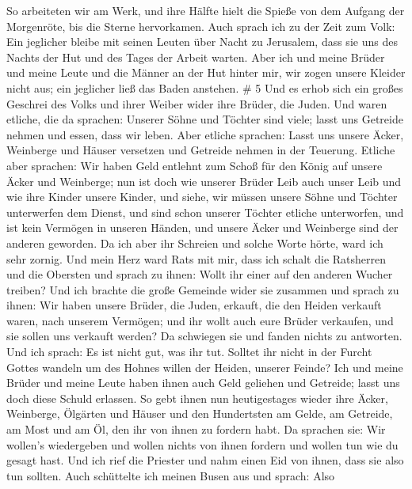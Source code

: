  So arbeiteten wir am Werk, und ihre Hälfte hielt die
Spieße von dem Aufgang der Morgenröte, bis die Sterne hervorkamen.
 Auch sprach ich zu der Zeit zum Volk: Ein jeglicher
bleibe mit seinen Leuten über Nacht zu Jerusalem, dass sie uns des
Nachts der Hut und des Tages der Arbeit warten.  Aber ich
und meine Brüder und meine Leute und die Männer an der Hut hinter mir,
wir zogen unsere Kleider nicht aus; ein jeglicher ließ das Baden
anstehen. \# 5  Und es erhob sich ein großes Geschrei des
Volks und ihrer Weiber wider ihre Brüder, die Juden.  Und
waren etliche, die da sprachen: Unserer Söhne und Töchter sind viele;
lasst uns Getreide nehmen und essen, dass wir leben.  Aber
etliche sprachen: Lasst uns unsere Äcker, Weinberge und Häuser versetzen
und Getreide nehmen in der Teuerung.  Etliche aber
sprachen: Wir haben Geld entlehnt zum Schoß für den König auf unsere
Äcker und Weinberge;  nun ist doch wie unserer Brüder Leib
auch unser Leib und wie ihre Kinder unsere Kinder, und siehe, wir müssen
unsere Söhne und Töchter unterwerfen dem Dienst, und sind schon unserer
Töchter etliche unterworfen, und ist kein Vermögen in unseren Händen,
und unsere Äcker und Weinberge sind der anderen geworden. 
Da ich aber ihr Schreien und solche Worte hörte, ward ich sehr zornig.
 Und mein Herz ward Rats mit mir, dass ich schalt die
Ratsherren und die Obersten und sprach zu ihnen: Wollt ihr einer auf den
anderen Wucher treiben? Und ich brachte die große Gemeinde wider sie
zusammen  und sprach zu ihnen: Wir haben unsere Brüder,
die Juden, erkauft, die den Heiden verkauft waren, nach unserem
Vermögen; und ihr wollt auch eure Brüder verkaufen, und sie sollen uns
verkauft werden? Da schwiegen sie und fanden nichts zu antworten.
 Und ich sprach: Es ist nicht gut, was ihr tut. Solltet
ihr nicht in der Furcht Gottes wandeln um des Hohnes willen der Heiden,
unserer Feinde?  Ich und meine Brüder und meine Leute
haben ihnen auch Geld geliehen und Getreide; lasst uns doch diese Schuld
erlassen.  So gebt ihnen nun heutigestages wieder ihre
Äcker, Weinberge, Ölgärten und Häuser und den Hundertsten am Gelde, am
Getreide, am Most und am Öl, den ihr von ihnen zu fordern habt.
 Da sprachen sie: Wir wollen's wiedergeben und wollen
nichts von ihnen fordern und wollen tun wie du gesagt hast. Und ich rief
die Priester und nahm einen Eid von ihnen, dass sie also tun sollten.
 Auch schüttelte ich meinen Busen aus und sprach: Also
